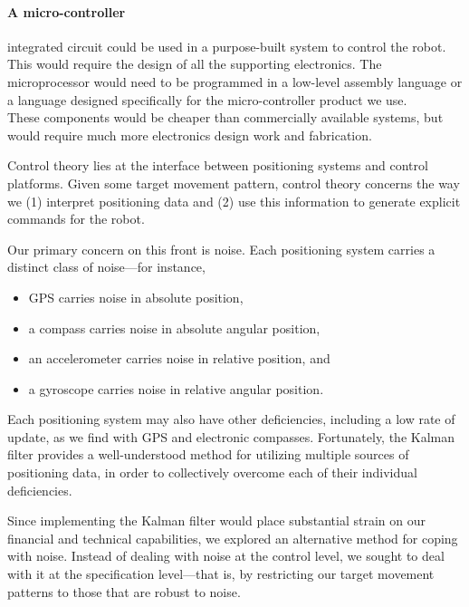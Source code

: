         \paragraph{A micro-controller} integrated circuit could be used in a purpose-built system to control the robot. This would require the design of all the supporting electronics. The microprocessor would need to be programmed in a low-level assembly language or a language designed specifically for the micro-controller product we use.\\
        These components would be cheaper than commercially available systems, but would require much more electronics design work and fabrication.


    \label{outline: control theory}
        Control theory lies at the interface between positioning systems and control platforms.
        Given some target movement pattern, control theory concerns the way we (1) interpret positioning data and (2) use this information to generate explicit commands for the robot.

        Our primary concern on this front is noise.
        Each positioning system carries a distinct class of noise---for instance,
        \begin{itemize}
            \item GPS carries noise in absolute position,
            \item a compass carries noise in absolute angular position,
            \item an accelerometer carries noise in relative position, and
            \item a gyroscope carries noise in relative angular position.
        \end{itemize}
        Each positioning system may also have other deficiencies, including a low rate of update, as we find with GPS and electronic compasses.
        Fortunately, the Kalman filter provides a well-understood method for utilizing multiple sources of positioning data, in order to collectively overcome each of their individual deficiencies.

        Since implementing the Kalman filter would place substantial strain on our financial and technical capabilities, we explored an alternative method for coping with noise.
        Instead of dealing with noise at the control level, we sought to deal with it at the specification level---that is, by restricting our target movement patterns to those that are robust to noise.

